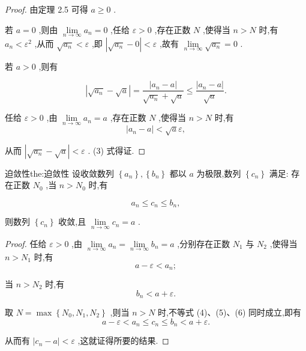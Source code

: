 \begin{proof}
由定理 2.5 可得 \(a \geq  0\) .

若 \(a = 0\) ,则由 \(\mathop{\lim }\limits_{{n \rightarrow  \infty }}{a}_{n} = 0\) ,任给 \(\varepsilon  > 0\) ,存在正数 \(N\) ,使得当 \(n > N\) 时,有 \({a}_{n} < {\varepsilon }^{2}\) ,从而 \(\sqrt{{a}_{n}} < \varepsilon\) ,即 \(\left| {\sqrt{{a}_{n}} - 0}\right|  < \varepsilon\) ,故有 \(\mathop{\lim }\limits_{{n \rightarrow  \infty }}\sqrt{{a}_{n}} = 0\) .

若 \(a > 0\) ,则有

\[
\left| {\sqrt{{a}_{n}} - \sqrt{a}}\right|  = \frac{\left| {a}_{n} - a\right| }{\sqrt{{a}_{n}} + \sqrt{a}} \leq  \frac{\left| {a}_{n} - a\right| }{\sqrt{a}}.
\]

任给 \(\varepsilon  > 0\) ,由 \(\mathop{\lim }\limits_{{n \rightarrow  \infty }}{a}_{n} = a\) ,存在正数 \(N\) ,使得当 \(n > N\) 时,有
\[
\left| {{a}_{n} - a}\right|  < \sqrt{a}\varepsilon ,
\]

从而 \(\left| {\sqrt{{a}_{n}} - \sqrt{a}}\right|  < \varepsilon\) . (3) 式得证.

\end{proof}


\begin{theorem}{迫敛性}{the:迫敛性}
设收敛数列 \(\left\{  {a}_{n}\right\}  ,\left\{  {b}_{n}\right\}\) 都以 \(a\) 为极限,数列 \(\left\{  {c}_{n}\right\}\) 满足: 存在正数 \({N}_{0}\) ,当 \(n > {N}_{0}\) 时,有

\[
{a}_{n} \leq  {c}_{n} \leq  {b}_{n}, \tag{4}
\]

则数列 \(\left\{  {c}_{n}\right\}\) 收敛,且 \(\mathop{\lim }\limits_{{n \rightarrow  \infty }}{c}_{n} = a\) .
\end{theorem}

\begin{proof}
任给 \(\varepsilon  > 0\) ,由 \(\mathop{\lim }\limits_{{n \rightarrow  \infty }}{a}_{n} = \mathop{\lim }\limits_{{n \rightarrow  \infty }}{b}_{n} = a\) ,分别存在正数 \({N}_{1}\) 与 \({N}_{2}\) ,使得当 \(n > {N}_{1}\) 时,有
\[
a - \varepsilon  < {a}_{n}; \tag{5}
\]

当 \(n > {N}_{2}\) 时,有
\[
{b}_{n} < a + \varepsilon . \tag{6}
\]

取 \(N = \max \left\{  {{N}_{0},{N}_{1},{N}_{2}}\right\}\) ,则当 \(n > N\) 时,不等式 (4)、(5)、(6) 同时成立,即有
\[
a - \varepsilon  < {a}_{n} \leq  {c}_{n} \leq  {b}_{n} < a + \varepsilon .
\]

从而有 \(\left| {{c}_{n} - a}\right|  < \varepsilon\) ,这就证得所要的结果.
\end{proof}


